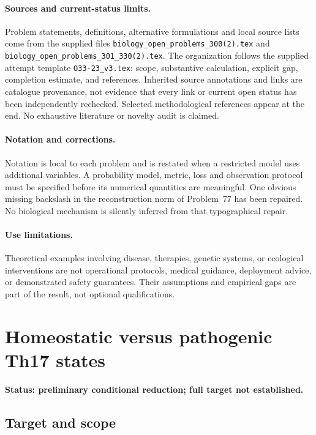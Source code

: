 \documentclass[11pt]{article}
\begin{document}
\paragraph{Sources and current-status limits.}
Problem statements, definitions, alternative formulations and local source lists
come from the supplied files
\texttt{biology\_open\_problems\_300(2).tex} and
\texttt{biology\_open\_problems\_301\_330(2).tex}.
The organization follows the supplied attempt template
\texttt{O33-23\_v3.tex}: scope, substantive calculation, explicit gap,
completion estimate, and references. Inherited source annotations and links are
catalogue provenance, not evidence that every link or current open status has
been independently rechecked. Selected methodological references appear at the
end. No exhaustive literature or novelty audit is claimed.

\paragraph{Notation and corrections.}
Notation is local to each problem and is restated when a restricted model uses
additional variables. A probability model, metric, loss and observation protocol
must be specified before its numerical quantities are meaningful. One obvious
missing backslash in the reconstruction norm of Problem~77 has been repaired.
No biological mechanism is silently inferred from that typographical repair.

\paragraph{Use limitations.}
Theoretical examples involving disease, therapies, genetic systems, or ecological
interventions are not operational protocols, medical guidance, deployment advice,
or demonstrated safety guarantees. Their assumptions and empirical gaps are part
of the result, not optional qualifications.


\section*{Homeostatic versus pathogenic Th17 states}
\label{prob:224}
\noindent\textbf{Status: preliminary conditional reduction; full target not established.}
\subsection{Target and scope}
\end{document}
